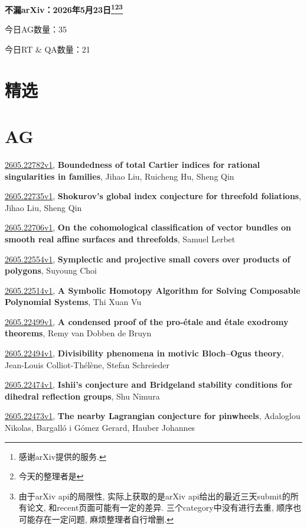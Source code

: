 \documentclass[9pt, a4paper]{article}
\theoremstyle{plain}
\theoremstyle{definition}
\theoremstyle{remark}
\newcommand{\arxiv}[3]{\href{https://arxiv.org/abs/#1}{#1}, \textbf{\textcolor{arxivblue}{#2}}, #3}
\newcommand{\AGnumber}{35}
\newcommand{\RTQAnumber}{21}
\newcommand{\NewestDate}{2026年5月23日}
\newcommand{\todayarXiver}{} %
\begin{document}
\begin{center}
    \Huge\textbf{不漏arXiv：\NewestDate\footnote{感谢arXiv提供的服务.}\footnote{今天的整理者是\todayarXiver}\footnote{由于arXiv api的局限性, 实际上获取的是arXiv api给出的最近三天submit的所有论文, 和recent页面可能有一定的差异. 三个category中没有进行去重, 顺序也可能存在一定问题, 麻烦整理者自行增删.}} \\
\end{center}

\setcounter{section}{-1}

\begin{center}
    今日AG数量：\AGnumber
    
    今日RT \& QA数量：\RTQAnumber
    
\end{center}


\section{精选}


\section{AG}
\arxiv{2605.22782v1}{Boundedness of total Cartier indices for rational singularities in families}{Jihao Liu, Ruicheng Hu, Sheng Qin}

\arxiv{2605.22735v1}{Shokurov's global index conjecture for threefold foliations}{Jihao Liu, Sheng Qin}

\arxiv{2605.22706v1}{On the cohomological classification of vector bundles on smooth real affine surfaces and threefolds}{Samuel Lerbet}

\arxiv{2605.22554v1}{Symplectic and projective small covers over products of polygons}{Suyoung Choi}

\arxiv{2605.22514v1}{A Symbolic Homotopy Algorithm for Solving Composable Polynomial Systems}{Thi Xuan Vu}

\arxiv{2605.22499v1}{A condensed proof of the pro-étale and étale exodromy theorems}{Remy van Dobben de Bruyn}

\arxiv{2605.22494v1}{Divisibility phenomena in motivic Bloch--Ogus theory}{Jean-Louis Colliot-Thélène, Stefan Schreieder}

\arxiv{2605.22474v1}{Ishii's conjecture and Bridgeland stability conditions for dihedral reflection groups}{Shu Nimura}

\arxiv{2605.22473v1}{The nearby Lagrangian conjecture for pinwheels}{Adaloglou Nikolas, Bargalló i Gómez Gerard, Hauber Johannes}
\end{document}
